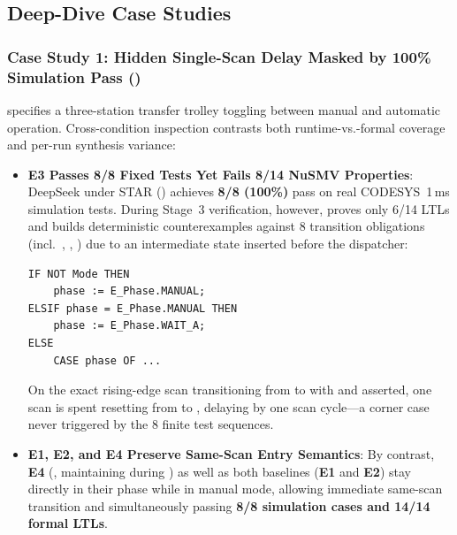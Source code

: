 
\subsection{Deep-Dive Case Studies}

\subsubsection{Case Study 1: Hidden Single-Scan Delay Masked by 100\% Simulation Pass ()}
 specifies a three-station transfer trolley toggling between manual and automatic operation. Cross-condition inspection contrasts both runtime-vs.-formal coverage and per-run synthesis variance:
\begin{itemize}
  \item \textbf{E3 Passes 8/8 Fixed Tests Yet Fails 8/14 NuSMV Properties}: DeepSeek under STAR () achieves \textbf{8/8 (100\%)} pass on real CODESYS~1\,ms simulation tests. During Stage~3 verification, however,  proves only 6/14 LTLs and builds deterministic counterexamples against 8 transition obligations (incl.\ , , ) due to an intermediate  state inserted before the dispatcher:
\begin{lstlisting}[caption={Relevant E3 (\code{PUB011}) mode-switch logic introducing a one-scan startup delay.},float=htbp]
IF NOT Mode THEN
    phase := E_Phase.MANUAL;
ELSIF phase = E_Phase.MANUAL THEN
    phase := E_Phase.WAIT_A;
ELSE
    CASE phase OF ...
\end{lstlisting}
  On the exact rising-edge scan transitioning from  to  with  and  asserted, one scan is spent resetting  from  to , delaying  by one scan cycle---a corner case never triggered by the 8 finite test sequences.
  \item \textbf{E1, E2, and E4 Preserve Same-Scan Entry Semantics}: By contrast, \textbf{E4} (, maintaining  during ) as well as both  baselines (\textbf{E1} and \textbf{E2}) stay directly in their  phase while in manual mode, allowing immediate same-scan transition and simultaneously passing \textbf{8/8 simulation cases and 14/14 formal LTLs}.
\end{itemize}


